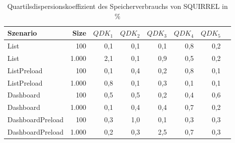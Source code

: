 
\begin{table}[ht]
\setlength{\extrarowheight}{-1pt}
\centering
\caption{Quartilsdispersionskoeffizient des Speicherverbrauchs von SQUIRREL in \%}
\begin{tabular}{lrrrrrrr}
\toprule
Szenario & Size & ${QDK_1}$ & ${QDK_2}$ & ${QDK_3}$& ${QDK_4}$ & ${QDK_5}$ \\
\midrule
	List & 100 & \cellcolor{red!1}  0,1 & \cellcolor{red!1}  0,1 & \cellcolor{red!1}  0,1 & \cellcolor{red!1}  0,8 & \cellcolor{red!1}  0,2 \\
	List & 1.000 & \cellcolor{red!3}  2,1 & \cellcolor{red!1}  0,1 & \cellcolor{red!1}  0,9 & \cellcolor{red!1}  0,5 & \cellcolor{red!1}  0,2 \\
	ListPreload & 100 & \cellcolor{red!1}  0,1 & \cellcolor{red!1}  0,4 & \cellcolor{red!1}  0,2 & \cellcolor{red!1}  0,8 & \cellcolor{red!1}  0,1 \\
	ListPreload & 1.000 & \cellcolor{red!1}  0,8 & \cellcolor{red!1}  0,1 & \cellcolor{red!1}  0,3 & \cellcolor{red!1}  0,1 & \cellcolor{red!1}  0,1 \\
	Dashboard & 100 & \cellcolor{red!1}  0,5 & \cellcolor{red!1}  0,5 & \cellcolor{red!1}  0,2 & \cellcolor{red!1}  0,4 & \cellcolor{red!1}  0,6 \\
	Dashboard & 1.000 & \cellcolor{red!1}  0,1 & \cellcolor{red!1}  0,4 & \cellcolor{red!1}  0,4 & \cellcolor{red!1}  0,7 & \cellcolor{red!1}  0,2 \\
	DashboardPreload & 100 & \cellcolor{red!1}  0,3 & \cellcolor{red!2}  1,0 & \cellcolor{red!1}  0,1 & \cellcolor{red!1}  0,3 & \cellcolor{red!1}  0,3 \\
	DashboardPreload & 1.000 & \cellcolor{red!1}  0,2 & \cellcolor{red!1}  0,3 & \cellcolor{red!3}  2,5 & \cellcolor{red!1}  0,7 & \cellcolor{red!1}  0,3 \\
\bottomrule
\end{tabular}
\label{tab:quartilsdispersionskoeffizient_speicherverbrauch_squirrel}
\end{table}
	